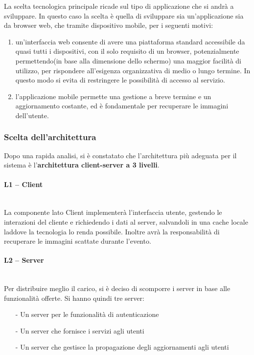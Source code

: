 La scelta tecnologica principale ricade sul tipo di applicazione che si andrà a
sviluppare.
In questo caso la scelta è quella di sviluppare sia un'applicazione sia da browser web, che tramite dispositivo mobile, per i seguenti motivi:
\begin{enumerate}
    \item un'interfaccia web consente di avere una
          piattaforma standard accessibile da quasi tutti i dispositivi, con il solo
          requisito di un browser, potenzialmente permettendo(in base alla dimensione dello schermo) una maggior facilità di utilizzo, per rispondere all'esigenza organizzativa di medio o lungo termine.
          In questo modo si evita di restringere le possibilità di accesso al servizio.
    \item  l'applicazione mobile permette una gestione a breve termine e un aggiornamento costante, ed è fondamentale per recuperare le immagini dell'utente.
\end{enumerate}

\subsubsection{Scelta dell'architettura}

Dopo una rapida analisi, si è constatato che l'architettura più adeguata per il
sistema è l'\textbf{architettura client-server a 3 livelli}.

\paragraph{L1 -- Client}\mbox{}\\
La componente lato Client implementerà l'interfaccia utente, gestendo le interazioni del cliente e richiedendo i dati al server,
salvandoli in una cache locale laddove la tecnologia lo renda possibile. Inoltre avrà la responsabilità di recuperare le immagini scattate durante l'evento.

\paragraph{L2 -- Server}\mbox{}\\
Per distribuire meglio il carico, si è deciso di scomporre i server in base alle funzionalità offerte. Si hanno quindi tre server:

\begin{itemize}
    \item[-] Un server per le funzionalità di autenticazione
    \item[-] Un server che fornisce i servizi agli utenti
    \item[-] Un server che gestisce la propagazione degli aggiornamenti agli utenti
\end{itemize}

